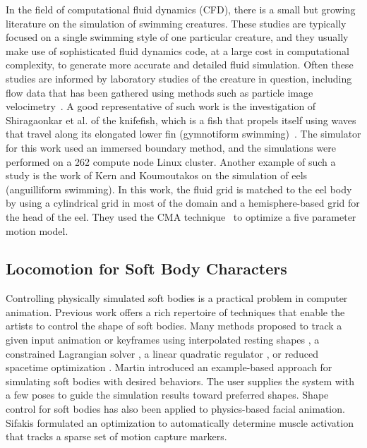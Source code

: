 In the field of computational fluid dynamics (CFD), there is a small but
growing literature on the simulation of swimming creatures.  These studies
are typically focused on a single swimming style of one particular creature,
and they usually make use of sophisticated fluid dynamics code, at a large cost in
computational complexity, to generate more accurate and detailed fluid simulation. Often these studies are informed by laboratory
studies of the creature in question, including flow data that has been
gathered using methods such as particle image
velocimetry~\cite{grant1997particle}.  A good representative of such work is
the investigation of Shiragaonkar et al. of the knifefish, which is a fish
that propels itself using waves that travel along its elongated lower fin
(gymnotiform swimming)~\cite{shirgaonkar2008hydrodynamics}.  The simulator
for this work used an immersed boundary method, and the simulations were
performed on a 262 compute node Linux cluster.  Another example of such a
study is the work of Kern and Koumoutakos \cite{kern2006simulations} on the simulation of eels
(anguilliform swimming).  In this work, the fluid
grid is matched to the eel body by using a cylindrical grid in most of the
domain and a hemisphere-based grid for the head of the eel.  They used the
CMA technique~\cite{hansen2004evaluating} to optimize a five parameter
motion model.

\subsection{Locomotion for Soft Body Characters}

Controlling physically simulated soft bodies is a practical problem in
computer animation. Previous work offers a rich repertoire of
techniques that enable the artists to control the shape of soft
bodies. Many methods proposed to track a given input animation or
keyframes using interpolated resting shapes \cite{Kondo:2005}, a
constrained Lagrangian solver \cite{Bergou:2007}, a linear quadratic
regulator \cite{Barbic:2008}, or reduced spacetime optimization
\cite{Barbic:2009}. Martin \etal \cite{Martin:2011} introduced an
example-based approach for simulating soft bodies with desired
behaviors. The user supplies the system with a few poses to guide the
simulation results toward preferred shapes. Shape control for soft
bodies has also been applied to physics-based facial
animation. Sifakis \cite{Sifakis:2005} formulated an optimization
to automatically determine muscle activation that tracks a sparse set
of motion capture markers.

